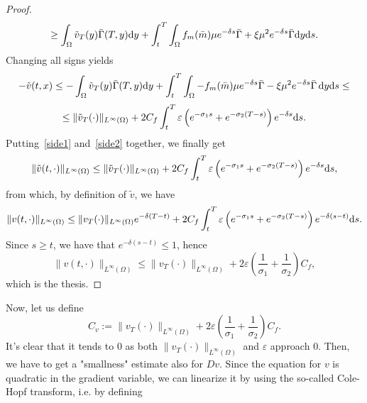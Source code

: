\documentclass[10pt,a4paper,nouppercase,nowrite]{article}
\numberwithin{equation}{section}
\newcommand{\di}{{\rm d}}
\newcommand{\eps}{\varepsilon}
\theoremstyle{definition}
\begin{document}
\begin{proof}
\begin{equation*}
		\end{equation*}
		\begin{equation*}
			\geq \int_{\Omega} \tilde{v}_T(y) \bar{\Gamma}(T,y) \di y + \int_t^T \int_{\Omega} f_m(\bar m) \mu e^{-\delta s}  \bar{\Gamma} + \xi \mu^2 e^{-\delta s}  \bar{\Gamma} \di y \di s.
		\end{equation*}
		Changing all signs yields
		\begin{equation*}
			-\tilde{v}(t,x) \le - \int_{\Omega} \tilde{v}_T(y) \bar{\Gamma}(T,y) \di y + \int_t^T \int_{\Omega} - f_m(\bar m) \mu e^{-\delta s}  \bar{\Gamma} - \xi \mu^2 e^{-\delta s}  \bar{\Gamma} \, \di y \di s \le
		\end{equation*}
		\begin{equation}
			\le \|\tilde{v}_T(\cdot)\|_{L^{\infty}(\Omega)} + 2C_f \int_t^T \eps \left( e^{-\sigma_1 s} + e^{-\sigma_2(T-s)} \right) e^{-\delta s} \di s.
			\label{side2}
		\end{equation}
		Putting~\eqref{side1} and~\eqref{side2} together, we finally get
		\begin{equation} \label{bothsides}
			\|\tilde{v}(t,\cdot)\|_{L^{\infty}(\Omega)} \le \|\tilde{v}_T(\cdot)\|_{L^{\infty}(\Omega)} + 2C_f \int_t^T \eps \left( e^{-\sigma_1 s} + e^{-\sigma_2(T-s)} \right) e^{-\delta s} \di s,
		\end{equation}
		from which, by definition of $\tilde{v}$, we have
		\begin{equation*}
			\|v(t,\cdot)\|_{L^{\infty}(\Omega)} \le \|v_T(\cdot)\|_{L^{\infty}(\Omega)} e^{-\delta(T-t)}
			+2C_f \int_t^T \eps \left( e^{-\sigma_1 s} + e^{-\sigma_2(T-s)} \right) e^{-\delta (s-t)} \di s.
		\end{equation*}
		Since $s \ge t$, we have that $e^{-\delta(s-t)} \le 1$, hence 
		\begin{equation*}
			\|v(t,\cdot)\|_{L^{\infty}(\Omega)} \le \|v_T(\cdot)\|_{L^{\infty}(\Omega)} + 2 \eps \left( \frac{1}{\sigma_1} + \frac{1}{\sigma_2} \right) C_f,
		\end{equation*}
		which is the thesis.
	\end{proof}
	Now, let us define 
	\begin{equation}C_v := \| v_T(\cdot) \|_{L^{\infty}(\Omega)} +2 \eps \left( \frac{1}{\sigma_1} + \frac{1}{\sigma_2} \right) C_f.
		\label{Cv}
	\end{equation}
	It's clear that it tends to $0$ as both $\| v_T(\cdot) \|_{L^{\infty}(\Omega)}$ and $\eps$ approach $0$.
	Then, we have to get a "smallness" estimate also for $Dv$. Since the equation for $v$ is quadratic in the gradient variable, we can linearize it by using the so-called Cole-Hopf transform, i.e. by defining
\end{document}
